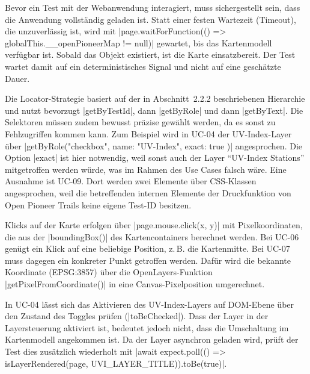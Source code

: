 Bevor ein Test mit der Webanwendung interagiert, muss sichergestellt sein, dass die Anwendung vollständig geladen ist. Statt einer festen Wartezeit (Timeout), die unzuverlässig ist, wird mit \code|page.waitForFunction(() => globalThis.__openPioneerMap != null)| gewartet, bis das Kartenmodell verfügbar ist. Sobald das Objekt existiert, ist die Karte einsatzbereit. Der Test wartet damit auf ein deterministisches Signal und nicht auf eine geschätzte Dauer.

Die Locator-Strategie basiert auf der in Abschnitt~2.2.2 beschriebenen Hierarchie und nutzt bevorzugt \code|getByTestId|, dann \code|getByRole| und dann \code|getByText|. Die Selektoren müssen zudem bewusst präzise gewählt werden, da es sonst zu Fehlzugriffen kommen kann. Zum Beispiel wird in UC-04 der UV-Index-Layer über \code|getByRole("checkbox", { name: "UV-Index", exact: true })| angesprochen. Die Option \code|exact| ist hier notwendig, weil sonst auch der Layer \enquote{UV-Index Stations} mitgetroffen werden würde, was im Rahmen des Use Cases falsch wäre. Eine Ausnahme ist UC-09. Dort werden zwei Elemente über \ac{CSS}-Klassen angesprochen, weil die betreffenden internen Elemente der Druckfunktion von Open Pioneer Trails keine eigene Test-ID besitzen.

Klicks auf der Karte erfolgen über \code|page.mouse.click(x, y)| mit Pixelkoordinaten, die aus der \code|boundingBox()| des Kartencontainers berechnet werden. Bei UC-06 genügt ein Klick auf eine beliebige Position, z.\,B. die Kartenmitte. Bei UC-07 muss dagegen ein konkreter Punkt getroffen werden. Dafür wird die bekannte Koordinate (\ac{EPSG}:3857) über die OpenLayers-Funktion \code|getPixelFromCoordinate()| in eine Canvas-Pixelposition umgerechnet.

In UC-04 lässt sich das Aktivieren des UV-Index-Layers auf \ac{DOM}-Ebene über den Zustand des Toggles prüfen (\code|toBeChecked|). Dass der Layer in der Layersteuerung aktiviert ist, bedeutet jedoch nicht, dass die Umschaltung im Kartenmodell angekommen ist. Da der Layer asynchron geladen wird, prüft der Test dies zusätzlich wiederholt mit \code|await expect.poll(() => isLayerRendered(page, UVI_LAYER_TITLE)).toBe(true)|.
